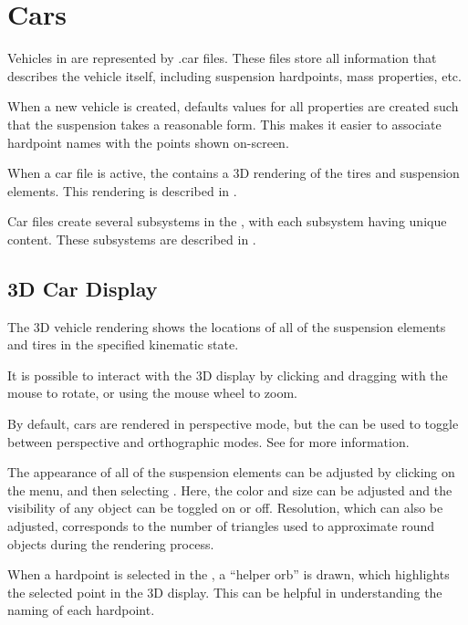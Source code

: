 \chapter{Cars} \label{ch:cars}

Vehicles in \vvase{} are represented by .car files.  These files store all information that describes the vehicle itself, including suspension hardpoints, mass properties, etc.

When a new vehicle is created, defaults values for all properties are created such that the suspension takes a reasonable form.  This makes it easier to associate hardpoint names with the points shown on-screen.

When a car file is active, the  contains a 3D rendering of the tires and suspension elements.  This rendering is described in .

Car files create several subsystems in the , with each subsystem having unique  content.  These subsystems are described in .

\section{3D Car Display} \label{sec:3dCarDisplay}

The 3D vehicle rendering shows the locations of all of the suspension elements and tires in the specified kinematic state.

It is possible to interact with the 3D display by clicking and dragging with the mouse to rotate, or using the mouse wheel to zoom.

By default, cars are rendered in perspective mode, but the  can be used to toggle between perspective and orthographic modes.  See  for more information.

The appearance of all of the suspension elements can be adjusted by clicking on the  menu, and then selecting .  Here, the color and size can be adjusted and the visibility of any object can be toggled on or off.  Resolution, which can also be adjusted, corresponds to the number of triangles used to approximate round objects during the rendering process.

When a hardpoint is selected in the , a ``helper orb'' is drawn, which highlights the selected point in the 3D display.  This can be helpful in understanding the naming of each hardpoint.

